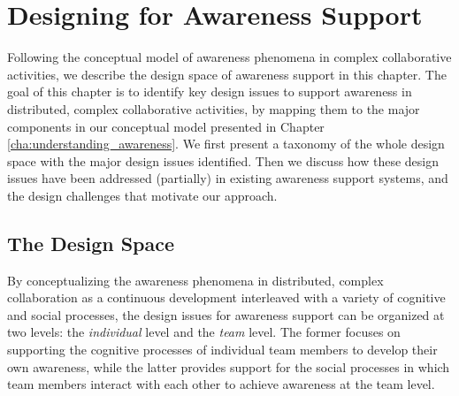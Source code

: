 \graphicspath{{Figures/}}

\chapter{Designing for Awareness Support} %
\label{cha:designing_for_awareness_support}
Following the conceptual model of awareness phenomena in complex collaborative activities, we describe the design space of awareness support in this chapter. The goal of this chapter is to identify key design issues to support awareness in distributed, complex collaborative activities, by mapping them to the major components in our conceptual model presented in Chapter \ref{cha:understanding_awareness}. We first present a taxonomy of the whole design space with the major design issues identified. Then we discuss how these design issues have been addressed (partially) in existing awareness support systems, and the design challenges that motivate our approach. 

\section{The Design Space} %
\label{sec:the_design_space}
By conceptualizing the awareness phenomena in distributed, complex collaboration as a continuous development interleaved with a variety of cognitive and social processes, the design issues for awareness support can be organized at two levels: the \emph{individual} level and the \emph{team} level. The former focuses on supporting the cognitive processes of individual team members to develop their own awareness, while the latter provides support for the social processes in which team members interact with each other to achieve awareness at the team level.

